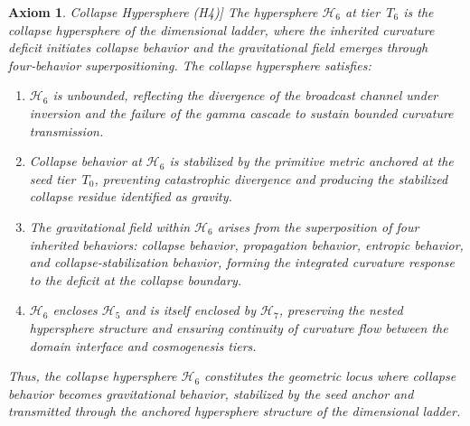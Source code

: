\documentclass[final,onefignum,onetabnum]{siamart}
\newtheorem{axiom}{Axiom}
\begin{document}
\begin{axiom}Collapse Hypersphere (H4)]
The hypersphere $\mathcal{H}_{6}$ at tier~$T_{6}$ is the collapse hypersphere of the dimensional ladder, where the inherited curvature deficit initiates collapse behavior and the gravitational field emerges through four‑behavior superpositioning. The collapse hypersphere satisfies:

\begin{enumerate}
    \item $\mathcal{H}_{6}$ is unbounded, reflecting the divergence of the broadcast channel under inversion and the failure of the gamma cascade to sustain bounded curvature transmission.
    \item Collapse behavior at $\mathcal{H}_{6}$ is stabilized by the primitive metric anchored at the seed tier~$T_{0}$, preventing catastrophic divergence and producing the stabilized collapse residue identified as gravity.
    \item The gravitational field within $\mathcal{H}_{6}$ arises from the superposition of four inherited behaviors: collapse behavior, propagation behavior, entropic behavior, and collapse‑stabilization behavior, forming the integrated curvature response to the deficit at the collapse boundary.
    \item $\mathcal{H}_{6}$ encloses $\mathcal{H}_{5}$ and is itself enclosed by $\mathcal{H}_{7}$, preserving the nested hypersphere structure and ensuring continuity of curvature flow between the domain interface and cosmogenesis tiers.
\end{enumerate}

Thus, the collapse hypersphere $\mathcal{H}_{6}$ constitutes the geometric locus where collapse behavior becomes gravitational behavior, stabilized by the seed anchor and transmitted through the anchored hypersphere structure of the dimensional ladder.
\end{axiom}
\end{document}

